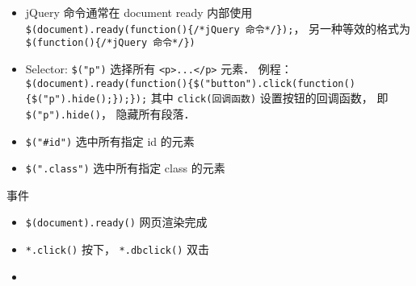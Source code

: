 

\begin{itemize}
\item jQuery 命令通常在 document ready 内部使用 \verb|$(document).ready(function(){/*jQuery 命令*/});|， 另一种等效的格式为 \verb|$(function(){/*jQuery 命令*/})|
\item Selector: \verb|$("p")| 选择所有 \verb|<p>...</p>| 元素． 例程： \verb|$(document).ready(function(){$("button").click(function(){$("p").hide();});});| 其中 \verb|click(回调函数)| 设置按钮的回调函数， 即 \verb|$("p").hide()|， 隐藏所有段落．
\item \verb|$("#id")| 选中所有指定 id 的元素
\item \verb|$(".class")| 选中所有指定 class 的元素
\end{itemize}

事件
\begin{itemize}
\item \verb|$(document).ready()| 网页渲染完成
\item \verb|*.click()| 按下， \verb|*.dbclick()| 双击
\item 
\end{itemize}
